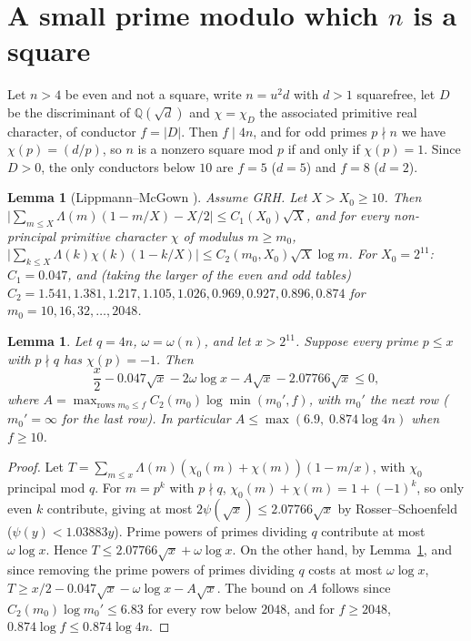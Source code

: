 \documentclass[11pt]{amsart}
\newtheorem{lemma}[theorem]{Lemma}
\theoremstyle{remark}\newtheorem*{remark}{Remark}
\begin{document}
\section{A small prime modulo which $n$ is a square}
Let $n>4$ be even and not a square, write $n=u^2d$ with $d>1$ squarefree, let $D$ be the discriminant of $\mathbb{Q}(\sqrt d)$ and $\chi=\chi_D$ the associated primitive real character, of conductor $f=|D|$. Then $f\mid 4n$, and for odd primes $p\nmid n$ we have $\chi(p)=(d/p)$, so $n$ is a nonzero square mod $p$ if and only if $\chi(p)=1$. Since $D>0$, the only conductors below $10$ are $f=5$ ($d=5$) and $f=8$ ($d=2$).

\begin{lemma}[Lippmann--McGown {\cite[Prop.~1]{LM}}]\label{LM}
Assume GRH. Let $X>X_0\ge10$. Then
$\bigl|\sum_{m\le X}\Lambda(m)(1-m/X)-X/2\bigr|\le C_1(X_0)\sqrt X$, and for every non-principal primitive character $\chi$ of modulus $m\ge m_0$,
$\bigl|\sum_{k\le X}\Lambda(k)\chi(k)(1-k/X)\bigr|\le C_2(m_0,X_0)\sqrt X\log m$.
For $X_0=2^{11}$: $C_1=0.047$, and (taking the larger of the even and odd tables) $C_2=1.541,1.381,1.217,1.105,1.026,0.969,0.927,0.896,0.874$ for $m_0=10,16,32,\dots,2048$.
\end{lemma}

\begin{lemma}\label{A}
Let $q=4n$, $\omega=\omega(n)$, and let $x>2^{11}$. Suppose every prime $p\le x$ with $p\nmid q$ has $\chi(p)=-1$. Then
\[ \frac x2-0.047\sqrt x-2\omega\log x-A\sqrt x-2.07766\sqrt x\le 0, \]
where $A=\max_{\text{rows } m_0\le f} C_2(m_0)\log\min(m_0',f)$, with $m_0'$ the next row ($m_0'=\infty$ for the last row). In particular $A\le\max(6.9,\;0.874\log 4n)$ when $f\ge10$.
\end{lemma}
\begin{proof}
Let $T=\sum_{m\le x}\Lambda(m)(\chi_0(m)+\chi(m))(1-m/x)$, with $\chi_0$ principal mod $q$. For $m=p^k$ with $p\nmid q$, $\chi_0(m)+\chi(m)=1+(-1)^k$, so only even $k$ contribute, giving at most $2\psi(\sqrt x)\le2.07766\sqrt x$ by Rosser--Schoenfeld ($\psi(y)<1.03883y$). Prime powers of primes dividing $q$ contribute at most $\omega\log x$. Hence $T\le2.07766\sqrt x+\omega\log x$. On the other hand, by Lemma~\ref{LM}, and since removing the prime powers of primes dividing $q$ costs at most $\omega\log x$,
$T\ge x/2-0.047\sqrt x-\omega\log x-A\sqrt x$. The bound on $A$ follows since $C_2(m_0)\log m_0'\le 6.83$ for every row below $2048$, and for $f\ge2048$, $0.874\log f\le0.874\log4n$.
\end{proof}
\end{document}
